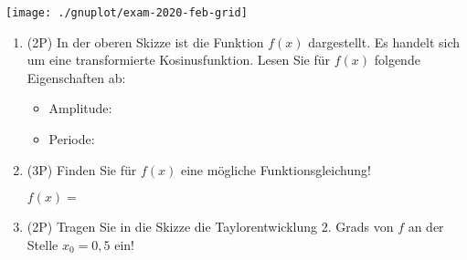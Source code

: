 \begin{center}
	\texttt{[image: ./gnuplot/exam-2020-feb-grid]}
\end{center}

\begin{enumerate}[label=(\alph*)]

	\item (2P) In der oberen Skizze ist die Funktion $f(x)$ dargestellt. Es handelt sich um eine transformierte Kosinusfunktion. Lesen Sie für $f(x)$ folgende Eigenschaften ab:
		\begin{itemize}		
			\bigskip
		
			\item Amplitude:
		
			\bigskip
			\bigskip
		
			\item Periode:
		
			\bigskip
			\bigskip
			\bigskip		
		\end{itemize}

	\item (3P) Finden Sie für $f(x)$ eine mögliche Funktionsgleichung! \\
	
		\bigskip
	
		$f(x)=$
	
		\bigskip
		\bigskip
		\bigskip
	
	\item (2P) Tragen Sie in die Skizze die Taylorentwicklung 2. Grads von $f$ an der Stelle $x_0=0{,}5$ ein!

\end{enumerate}

